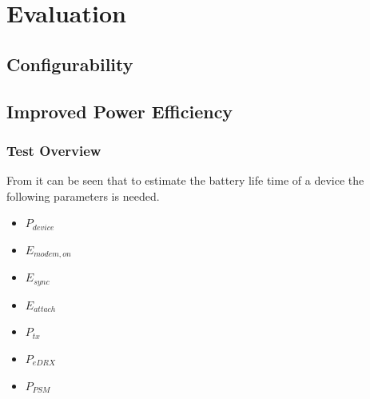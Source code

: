 \section{Evaluation}


\subsection{Configurability}





\subsection{Improved Power Efficiency}
\subsubsection{Test Overview}
From  it can be seen that to estimate the battery life time of a device the following parameters is needed.
\begin{itemize}
\item $P_{device}$
\item $E_{modem,on}$
\item $E_{sync}$
\item $E_{attach}$
\item $P_{tx}$
\item $P_{eDRX}$
\item $P_{PSM}$
\end{itemize}

